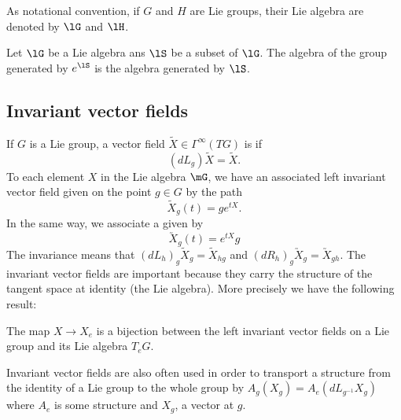 As notational convention, if $G$ and $H$ are Lie groups, their Lie algebra are denoted by $\lG$ and $\lH$.

\begin{lemma}		\label{LemAlgEtGroupesGenere}
	Let $\lG$ be a Lie algebra ans $\lS$ be a subset of $\lG$. The algebra of the group generated by $ e^{\lS}$ is the algebra generated by $\lS$.
\end{lemma}

\subsection{Invariant vector fields}

If $G$ is a Lie group, a vector field $\tilde X\in\Gamma^{\infty}(TG)$ is  if
\begin{equation}
	(dL_g)\tilde X=\tilde X.
\end{equation}
To each element $X$ in the Lie algebra $\mG$, we have an associated left invariant vector field given on the point $g\in G$ by the path
\begin{equation}
	\tilde X_g(t)=ge^{tX}.
\end{equation}
In the same way, we associate a  given by
\begin{equation}
	\utilde X_g(t)=e^{tX}g
\end{equation}
The invariance means that $(dL_h)_g\tilde X_g=\tilde X_{hg}$ and $(dR_h)_g\utilde X_g=\utilde X_{gh}$. The invariant vector fields are important because they carry the structure of the tangent space at identity (the Lie algebra). More precisely we have the following result:

\begin{theorem}
	The map $X\to X_e$ is a bijection between the left invariant vector fields on a Lie group and its Lie algebra $T_eG$.
\end{theorem}
Invariant vector fields are also often used in order to transport a structure from the identity of a Lie group to the whole group by $A_g(X_g)=A_e(dL_{g^{-1}}X_g)$ where $A_e$ is some structure and $X_g$, a vector at $g$.


